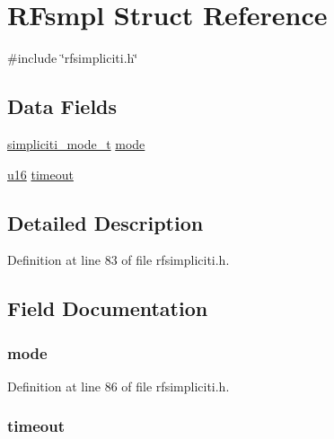 \hypertarget{structRFsmpl}{\section{\-R\-Fsmpl \-Struct \-Reference}
\label{structRFsmpl}
}


{\ttfamily \#include \char`\"{}rfsimpliciti.\-h\char`\"{}}

\subsection*{\-Data \-Fields}
\begin{DoxyCompactItemize}
\item 
\hyperlink{rfsimpliciti_8h_a8f634dc8404e983a244ef648a1c38ece}{simpliciti\-\_\-mode\-\_\-t} \hyperlink{structRFsmpl_acd0291bcfc1da85956dd49b6b90e6ca3}{mode}
\item 
\hyperlink{main__ED__BM_8c_a9e6c91d77e24643b888dbd1a1a590054}{u16} \hyperlink{structRFsmpl_a735bf6536b07682f96c9417b0f1e9079}{timeout}
\end{DoxyCompactItemize}


\subsection{\-Detailed \-Description}


\-Definition at line 83 of file rfsimpliciti.\-h.



\subsection{\-Field \-Documentation}
\hypertarget{structRFsmpl_acd0291bcfc1da85956dd49b6b90e6ca3}{
\subsubsection[{mode}]{ {\bf mode}}}\label{structRFsmpl_acd0291bcfc1da85956dd49b6b90e6ca3}


\-Definition at line 86 of file rfsimpliciti.\-h.

\hypertarget{structRFsmpl_a735bf6536b07682f96c9417b0f1e9079}{
\subsubsection[{timeout}]{ {\bf timeout}}}\label{structRFsmpl_a735bf6536b07682f96c9417b0f1e9079}


